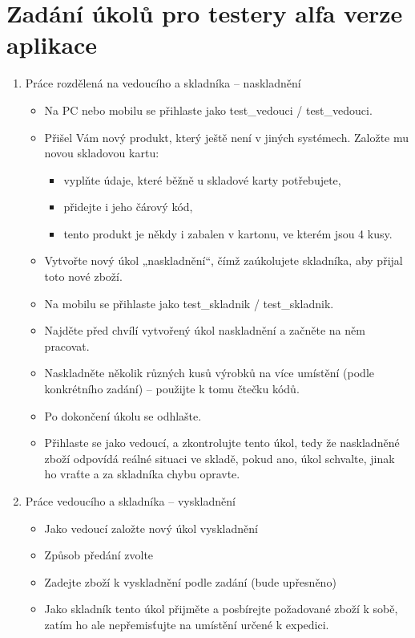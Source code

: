 \chapter{Zadání úkolů pro testery alfa verze aplikace} \label{ap:testing_tasks}

\begin{enumerate}
	\item Práce rozdělená na vedoucího a skladníka – naskladnění
	\begin{itemize}
		\item Na PC nebo mobilu se přihlaste jako test\_vedouci / test\_vedouci.
		\item Přišel Vám nový produkt, který ještě není v jiných systémech. Založte mu novou skladovou kartu:
		\begin{itemize}
			\item vyplňte údaje, které běžně u skladové karty potřebujete,
			\item přidejte i jeho čárový kód,
			\item tento produkt je někdy i zabalen v kartonu, ve kterém jsou 4 kusy.
		\end{itemize}
		\item Vytvořte nový úkol „naskladnění“, čímž zaúkolujete skladníka, aby přijal toto nové zboží.
		\item Na mobilu se přihlaste jako test\_skladnik / test\_skladnik.
		\item Najděte před chvílí vytvořený úkol naskladnění a začněte na něm pracovat.
		\item Naskladněte několik různých kusů výrobků na více umístění (podle konkrétního zadání) – použijte k tomu čtečku kódů.
		\item Po dokončení úkolu se odhlašte.
		\item Přihlaste se jako vedoucí, a zkontrolujte tento úkol, tedy že naskladněné zboží odpovídá reálné situaci ve skladě, pokud ano, úkol schvalte, jinak ho vraťte a za skladníka chybu opravte.
	\end{itemize}
	\item Práce vedoucího a skladníka – vyskladnění
	\begin{itemize}
		\item Jako vedoucí založte nový úkol vyskladnění
		\item Způsob předání zvolte 
		\item Zadejte zboží k vyskladnění podle zadání (bude upřesněno)
		\item Jako skladník tento úkol přijměte a posbírejte požadované zboží k sobě, zatím ho ale nepřemisťujte na umístění určené k expedici.

\end{itemize}
\end{enumerate}
